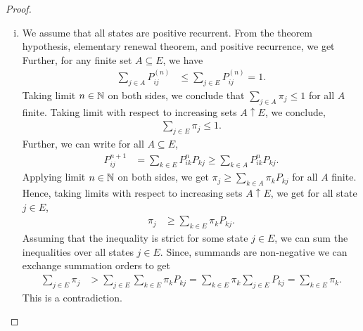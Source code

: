 \documentclass[a4paper,10pt,english]{article}
\begin{document}
\begin{proof}
\begin{enumerate}[i)]
\item 
We assume that all states are positive recurrent.
From the theorem hypothesis, elementary renewal theorem, and positive recurrence, we get
Further, for any finite set $A \subseteq E$, we have
\begin{align*}
\sum_{j \in A} P_{ij}^{(n)}&\leq \sum_{j \in E} P_{ij}^{(n)} = 1.
\end{align*}
Taking limit $n \in \mathbb{N}$ on both sides, we conclude that $\sum_{j \in A}\pi_j  \leq 1$ for all $A$ finite. 
Taking limit with respect to increasing sets $A \uparrow E$, we conclude,  
\begin{align*}
\sum_{j \in E} \pi_j \leq 1.
\end{align*}
Further, we can write for all $A \subseteq E$,
\begin{align*}
P_{ij}^{n+1} &= \sum_{k \in E}P_{ik}^nP_{kj} \geq \sum_{k \in A}P_{ik}^nP_{kj}.
\end{align*}
Applying limit $n \in \mathbb{N}$ on both sides, %
we get $\pi_j \geq \sum_{k \in A} \pi_kP_{kj}$ for all $A$ finite. 
Hence, taking limits with respect to increasing sets $A \uparrow E$, we get for all state $j \in E$,
\begin{align*}
\pi_j &\geq \sum_{k\in E} \pi_kP_{kj}.
\end{align*}	
Assuming that the inequality is strict for some state $j \in E$, we can sum the inequalities over all states $j \in E$. 
Since, summands are non-negative we can exchange summation orders to get
\begin{align*}
\sum_{j \in E} \pi_j &> \sum_{j \in E} \sum_{k \in E}\pi_kP_{kj} = \sum_{k \in E} \pi_k \sum_{j \in E} P_{kj} = \sum_{k \in E} \pi_k.
\end{align*}	
This is a contradiction. 

\end{enumerate}
\end{proof}
\end{document}
